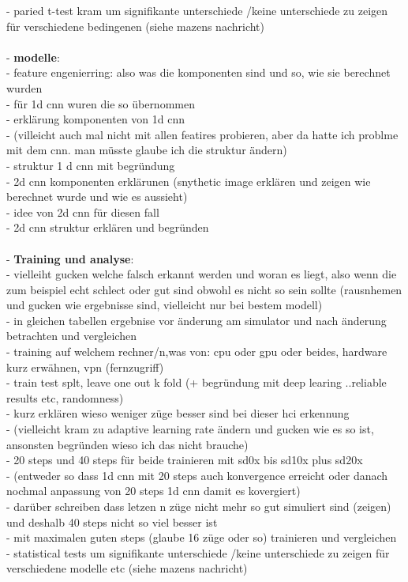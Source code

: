- paried t-test kram um signifikante unterschiede /keine unterschiede zu zeigen für verschiedene bedingenen (siehe mazens nachricht)\\\\
- \textbf{modelle}:\\
- feature engenierring: also was die komponenten sind und so, wie sie berechnet wurden\\
- für 1d cnn wuren die so übernommen\\
- erklärung komponenten von 1d cnn \\
- (villeicht auch mal nicht mit allen featires probieren, aber da hatte ich problme mit dem cnn. man müsste glaube ich die struktur ändern)\\
- struktur 1 d cnn mit begründung\\ 
- 2d cnn komponenten erklärunen (snythetic image erklären und zeigen wie berechnet wurde und wie es aussieht)\\
- idee von 2d cnn für diesen fall\\
- 2d cnn struktur erklären und begründen\\\\
- \textbf{Training und analyse}:\\
- vielleiht gucken welche falsch erkannt werden und woran es liegt, also wenn die zum beispiel echt schlect oder gut sind obwohl es nicht so sein sollte (rausnhemen und gucken wie ergebnisse sind, vielleicht nur bei bestem modell)\\
- in gleichen tabellen ergebnise vor änderung am simulator und nach änderung betrachten und vergleichen\\
- training auf welchem rechner/n,was von: cpu oder gpu oder beides, hardware kurz erwähnen, vpn (fernzugriff)\\
- train test splt, leave one out k fold (+ begründung mit deep learing ..reliable results etc, randomness) \\
- kurz erklären wieso weniger züge besser sind bei dieser hci erkennung\\
- (vielleicht kram zu adaptive learning rate ändern und gucken wie es so ist, ansonsten begründen wieso ich das nicht brauche) \\
- 20 steps und 40 steps für beide trainieren mit sd0x bis sd10x plus sd20x\\
- (entweder so dass 1d cnn mit 20 steps auch konvergence erreicht oder danach nochmal anpassung von 20 steps 1d cnn damit es kovergiert)\\
- darüber schreiben dass letzen n züge nicht mehr so gut simuliert sind (zeigen) und deshalb 40 steps nicht so viel besser ist \\
- mit maximalen guten steps (glaube 16 züge oder so) trainieren und vergleichen\\
- statistical tests um signifikante unterschiede /keine unterschiede zu zeigen für verschiedene modelle etc (siehe mazens nachricht)\\


